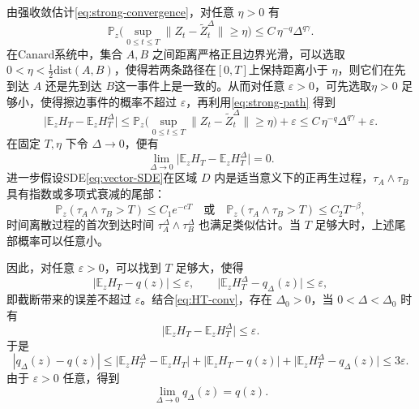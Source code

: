 	由强收敛估计\eqref{eq:strong-convergence}，对任意 \(\eta>0\) 有
	\begin{equation}\label{eq:strong-path}
		\mathbb{P}_z\Big(\sup_{0\le t\le T}\|Z_t - \widetilde{Z}_t^\Delta\| \ge \eta\Big)
		\le C\,\eta^{-q}\Delta^{q\gamma}.
	\end{equation}
	在Canard系统中，集合 \(A,B\) 之间距离严格正且边界光滑，可以选取 \(0<\eta<\frac12\mathrm{dist}(A,B)\)，使得若两条路径在\([0,T]\)上保持距离小于 \(\eta\)，则它们在先到达 \(A\) 还是先到达 \(B\)这一事件上是一致的。从而对任意 \(\varepsilon>0\)，可先选取\(\eta>0\) 足够小，使得擦边事件的概率不超过 \(\varepsilon\)，再利用\eqref{eq:strong-path} 得到
	\[
	\big|\mathbb{E}_z H_T - \mathbb{E}_z H_T^\Delta\big|
	\le \mathbb{P}_z\Big(\sup_{0\le t\le T}\|Z_t - \widetilde{Z}_t^\Delta\| \ge \eta\Big) + \varepsilon
	\le C\,\eta^{-q}\Delta^{q\gamma} + \varepsilon.
	\]
	在固定 \(T,\eta\) 下令 \(\Delta\to0\)，便有
	\begin{equation}\label{eq:HT-conv}
		\lim_{\Delta\to0}\big|\mathbb{E}_z H_T - \mathbb{E}_z H_T^\Delta\big| = 0.
	\end{equation}
	进一步假设SDE\eqref{eq:vector-SDE}在区域 \(D\) 内是适当意义下的正再生过程，\(\tau_A\wedge\tau_B\) 具有指数或多项式衰减的尾部：
	\begin{equation}\label{eq:tail}
		\mathbb{P}_z(\tau_A\wedge\tau_B > T) \le C_1 e^{-cT}
		\quad\text{或}\quad
		\mathbb{P}_z(\tau_A\wedge\tau_B > T) \le C_2 T^{-\beta},
	\end{equation}
	时间离散过程的首次到达时间 \(\tau_A^\Delta\wedge\tau_B^\Delta\) 也满足类似估计。当 \(T\) 足够大时，上述尾部概率可以任意小。
	
	因此，对任意 \(\varepsilon>0\)，可以找到 \(T\) 足够大，使得
	\begin{equation}\label{eq:tail-H}
		\big|\mathbb{E}_z H_T - q(z)\big| \le \varepsilon,\qquad
		\big|\mathbb{E}_z H_T^\Delta - q_\Delta(z)\big| \le \varepsilon,
	\end{equation}
	即截断带来的误差不超过 \(\varepsilon\)。结合\eqref{eq:HT-conv}，存在 \(\Delta_0>0\)，当 \(0<\Delta<\Delta_0\) 时有
	\[
	\big|\mathbb{E}_z H_T - \mathbb{E}_z H_T^\Delta\big|\le\varepsilon.
	\]
	于是
	\[
	|q_\Delta(z)-q(z)|
	\le \big|\mathbb{E}_z H_T^\Delta-\mathbb{E}_z H_T\big|
	+ \big|\mathbb{E}_z H_T - q(z)\big|
	+ \big|\mathbb{E}_z H_T^\Delta-q_\Delta(z)\big|
	\le 3\varepsilon.
	\]
	由于 \(\varepsilon>0\) 任意，得到
	\begin{equation}\label{eq:qDelta-to-q}
		\lim_{\Delta\to0} q_\Delta(z) = q(z).
	\end{equation}
	
